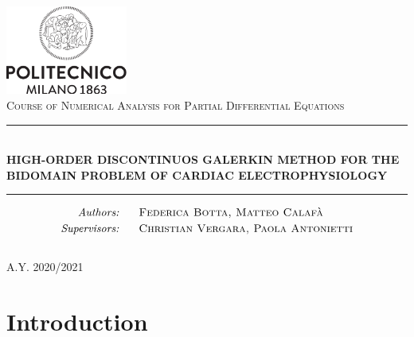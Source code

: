 \documentclass[a4paper,12pt]{article}
\begin{document}
	
	\begin{titlepage}
	    \thispagestyle{empty}
	    \begin{center}
	    	\includegraphics[width = 4cm]{./polimi-logo.png}\\ \vspace{3mm}
	    	\normalsize{\textsc{Course of Numerical Analysis for Partial Differential Equations}}
	    	
	    	\vspace{20mm}
	    	\rule{15cm}{0.1mm} \\ \vspace{4.5mm}
	    	 \Huge{\textbf{HIGH-ORDER DISCONTINUOS GALERKIN METHOD FOR THE BIDOMAIN PROBLEM OF CARDIAC ELECTROPHYSIOLOGY}} \\
	    	\rule{15cm}{0.1mm}
	    	\vspace{20mm}
	    	
	    	\Large{
	    	\begin{align*}
	    	\emph{Authors:}& \hspace{5mm} \textsc{ Federica Botta, Matteo Calafà}\\
	    	\emph{Supervisors:}& \hspace{5mm} \textsc{ Christian Vergara, Paola Antonietti}
	    	\end{align*}
	         } \\
	    	\vspace{20mm}
	    	\large{\textsc{A.Y. 2020/2021}}
	    \end{center}
	\end{titlepage}



    \restoregeometry
    
    \tableofcontents
    \newpage
    
    \section{Introduction}
\end{document}
